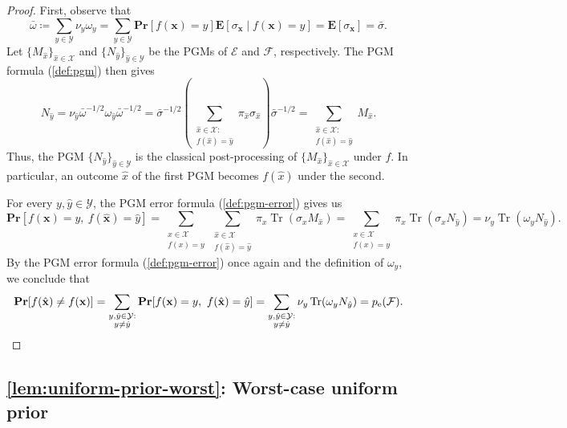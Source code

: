 \documentclass[11pt]{article}
\theoremstyle{remark}
\newcommand{\cX}{\mathcal{X}}
\newcommand{\cY}{\mathcal{Y}}
\newcommand{\cE}{\mathcal{E}}
\newcommand{\cF}{\mathcal{F}}
\newcommand{\Tr}{\operatorname{Tr}}
\newcommand{\Eb}{\mathbf{E}}
\newcommand{\Prb}{\mathbf{Pr}}
\newcommand{\bxhat}{\hat{\mathbf{x}}}
\newcommand{\bx}{\mathbf{x}}
\begin{document}
\begin{proof}
First, observe that
\begin{equation*}
\bar{\omega}
\coloneqq \sum_{y \in \cY}{\nu_y \omega_y}
= \sum_{y \in \cY}{\Prb[f(\bx) = y]\Eb[\sigma_{\bx} \mid f(\bx) = y]}
= \Eb[\sigma_{\bx}]
= \bar{\sigma}.
\end{equation*}
Let $\{M_{\hat{x}}\}_{\hat{x} \in \cX}$ and $\{N_{\hat{y}}\}_{\hat{y} \in \cY}$ be the PGMs of $\cE$ and $\cF$, respectively. The PGM formula (\cref{def:pgm}) then gives
\begin{equation*}
N_{\hat{y}} = \nu_{\hat{y}}\bar{\omega}^{-1/2}\omega_{\hat{y}}\bar{\omega}^{-1/2} = \bar{\sigma}^{-1/2}
\left(\sum_{\substack{\hat{x} \in \cX : \\ f(\hat{x}) = \hat{y}}}{\pi_{\hat{x}}\sigma_{\hat{x}}}\right)
\bar{\sigma}^{-1/2} = \sum_{\substack{\hat{x} \in \cX : \\ f(\hat{x}) = \hat{y}}}{M_{\hat{x}}}.
\end{equation*}
Thus, the PGM $\{N_{\hat{y}}\}_{\hat{y} \in \cY}$ is the classical post-processing of $\{M_{\hat{x}}\}_{\hat{x} \in \cX}$ under $f$. In particular, an outcome $\hat{x}$ of the first PGM becomes $f(\hat{x})$ under the second.

For every $y,\hat{y} \in \cY$, the PGM error formula (\cref{def:pgm-error}) gives us
\begin{equation*}
\Prb[f(\bx) = y,\ f(\bxhat) = \hat{y}]
= \sum_{\substack{x \in \cX \\ f(x) = y}}{\sum_{\substack{\hat{x} \in \cX \\ f(\hat{x})
= \hat{y}}}{\pi_x\Tr(\sigma_xM_{\hat{x}})}}
= \sum_{\substack{x \in \cX \\ f(x) = y}}{\pi_x\Tr(\sigma_xN_{\hat{y}})}
= \nu_y\Tr(\omega_yN_{\hat{y}}).
\end{equation*}
By the PGM error formula (\cref{def:pgm-error}) once again and the definition of $\omega_y$, we conclude that
\begin{equation*}
\Prb[f(\bxhat) \neq f(\bx)]
= \sum_{\substack{y,\hat{y} \in \cY : \\ y \neq \hat{y}}}{\Prb[f(\bx) = y,\ f(\bxhat) = \hat{y}]}
= \sum_{\substack{y,\hat{y} \in \cY : \\ y \neq \hat{y}}}{\nu_y\Tr(\omega_yN_{\hat{y}})}
= p_{\mathrm{e}}(\cF).
\qedhere
\end{equation*}
\end{proof}

\subsection{\texorpdfstring{\cref{lem:uniform-prior-worst}}{Lemma }: Worst-case uniform prior}
\label{appsubsec:proof-uniform-prior}
\end{document}
